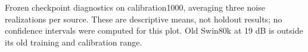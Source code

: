 Frozen checkpoint diagnostics on calibration1000, averaging three noise realizations per source. These are descriptive means, not holdout results; no confidence intervals were computed for this plot. Old Swin80k at 19 dB is outside its old training and calibration range.
